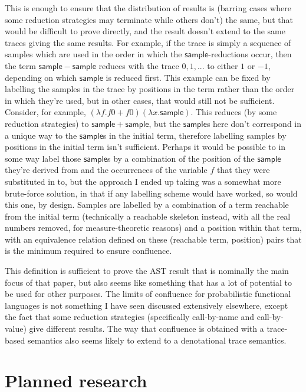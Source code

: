 \documentclass[titlepage]{article}
\newcommand{\tsample}{\mathsf{sample}}
\begin{document}
This is enough to ensure that the distribution of results is (barring cases where some reduction strategies may terminate while others don't) the same, but that would be difficult to prove directly, and the result doesn't extend to the same traces giving the same results. For example, if the trace is simply a sequence of samples which are used in the order in which the $\tsample$-reductions occur, then the term $\tsample - \tsample$ reduces with the trace $0, 1, ...$ to either $1$ or $-1$, depending on which $\tsample$ is reduced first. This example can be fixed by labelling the samples in the trace by positions in the term rather than the order in which they're used, but in other cases, that would still not be sufficient. Consider, for example, $(\lambda f. f 0 + f 0) (\lambda x. \tsample)$. This reduces (by some reduction strategies) to $\tsample + \tsample$, but the $\tsample$s here don't correspond in a unique way to the $\tsample$s in the initial term, therefore labelling samples by positions in the initial term isn't sufficient. Perhaps it would be possible to in some way label those $\tsample$s by a combination of the position of the $\tsample$ they're derived from and the occurrences of the variable $f$ that they were substituted in to, but the approach I ended up taking was a somewhat more brute-force solution, in that if any labelling scheme would have worked, so would this one, by design. Samples are labelled by a combination of a term reachable from the initial term (technically a reachable skeleton instead, with all the real numbers removed, for measure-theoretic reasons) and a position within that term, with an equivalence relation defined on these (reachable term, position) pairs that is the minimum required to ensure confluence.

This definition is sufficient to prove the AST result that is nominally the main focus of that paper, but also seems like something that has a lot of potential to be used for other purposes. The limits of confluence for probabilistic functional languages is not something I have seen discussed extensively elsewhere, except the fact that some reduction strategies (specifically call-by-name and call-by-value) give different results. The way that confluence is obtained with a trace-based semantics also seems likely to extend to a denotational trace semantics.


\section{Planned research}
\end{document}
